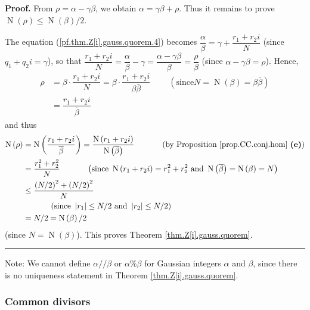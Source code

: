 \documentclass[numbers=enddot,12pt,final,onecolumn,notitlepage]{scrartcl}%
\numberwithin{exer}{subsection}
\theoremstyle{definition}
\newenvironment{proof}[1][Proof]{\noindent\textbf{#1.} }{\ \rule{0.5em}{0.5em}}
\begin{document}
\begin{proof}
From $\rho=\alpha-\gamma\beta$, we obtain $\alpha=\gamma\beta+\rho$. Thus it
remains to prove $\operatorname*{N}\left(  \rho\right)  \leq\operatorname*{N}%
\left(  \beta\right)  /2$.

The equation (\ref{pf.thm.Z[i].gauss.quorem.4}) becomes $\dfrac{\alpha}{\beta
}=\gamma+\dfrac{r_{1}+r_{2}i}{N}$ (since $q_{1}+q_{2}i=\gamma$), so that
$\dfrac{r_{1}+r_{2}i}{N}=\dfrac{\alpha}{\beta}-\gamma=\dfrac{\alpha
-\gamma\beta}{\beta}=\dfrac{\rho}{\beta}$ (since $\alpha-\gamma\beta=\rho$).
Hence,%
\begin{align*}
\rho &  =\beta\cdot\dfrac{r_{1}+r_{2}i}{N}=\beta\cdot\dfrac{r_{1}+r_{2}%
i}{\beta\overline{\beta}}\ \ \ \ \ \ \ \ \ \ \left(  \text{since
}N=\operatorname*{N}\left(  \beta\right)  =\beta\overline{\beta}\right) \\
&  =\dfrac{r_{1}+r_{2}i}{\overline{\beta}}%
\end{align*}
and thus%
\begin{align*}
\operatorname*{N}\left(  \rho\right)   &  =\operatorname*{N}\left(
\dfrac{r_{1}+r_{2}i}{\overline{\beta}}\right)  =\dfrac{\operatorname*{N}%
\left(  r_{1}+r_{2}i\right)  }{\operatorname*{N}\left(  \overline{\beta
}\right)  }\ \ \ \ \ \ \ \ \ \ \left(  \text{by Proposition
\ref{prop.CC.conj.hom} \textbf{(e)}}\right) \\
&  =\dfrac{r_{1}^{2}+r_{2}^{2}}{N}\ \ \ \ \ \ \ \ \ \ \left(  \text{since
}\operatorname*{N}\left(  r_{1}+r_{2}i\right)  =r_{1}^{2}+r_{2}^{2}\text{ and
}\operatorname*{N}\left(  \overline{\beta}\right)  =\operatorname*{N}\left(
\beta\right)  =N\right) \\
&  \leq\dfrac{\left(  N/2\right)  ^{2}+\left(  N/2\right)  ^{2}}{N}\\
&  \ \ \ \ \ \ \ \ \ \ \left(  \text{since }\left\vert r_{1}\right\vert \leq
N/2\text{ and }\left\vert r_{2}\right\vert \leq N/2\right) \\
&  =N/2=\operatorname*{N}\left(  \beta\right)  /2
\end{align*}
(since $N=\operatorname*{N}\left(  \beta\right)  $). This proves Theorem
\ref{thm.Z[i].gauss.quorem}.
\end{proof}

Note: We cannot define $\alpha//\beta$ or $\alpha\%\beta$ for Gaussian
integers $\alpha$ and $\beta$, since there is no uniqueness statement in
Theorem \ref{thm.Z[i].gauss.quorem}.

\subsubsection{Common divisors}
\end{document}
